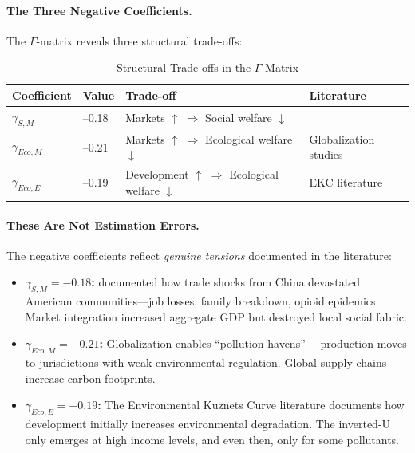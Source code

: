 \paragraph{The Three Negative Coefficients.}
The $\Gamma$-matrix reveals three structural trade-offs:

\begin{table}[htbp]
\centering
\caption{Structural Trade-offs in the $\Gamma$-Matrix}
\label{tab:structural-tradeoffs}
\renewcommand{\arraystretch}{1.4}
\begin{tabular}{@{}llll@{}}
\toprule
\textbf{Coefficient} & \textbf{Value} & \textbf{Trade-off} & \textbf{Literature} \\
\midrule
$\gamma_{S,M}$ & --0.18 & Markets $\uparrow$ $\Rightarrow$ Social welfare $\downarrow$ & \citet{autor2013china} \\
$\gamma_{Eco,M}$ & --0.21 & Markets $\uparrow$ $\Rightarrow$ Ecological welfare $\downarrow$ & Globalization studies \\
$\gamma_{Eco,E}$ & --0.19 & Development $\uparrow$ $\Rightarrow$ Ecological welfare $\downarrow$ & EKC literature \\
\bottomrule
\end{tabular}
\end{table}

\paragraph{These Are Not Estimation Errors.}
The negative coefficients reflect \emph{genuine tensions} documented in the literature:

\begin{itemize}
\item \textbf{$\gamma_{S,M} = -0.18$:} \citet{autor2013china} documented how trade 
shocks from China devastated American communities---job losses, family breakdown, 
opioid epidemics. Market integration increased aggregate GDP but destroyed 
local social fabric.

\item \textbf{$\gamma_{Eco,M} = -0.21$:} Globalization enables ``pollution havens''---
production moves to jurisdictions with weak environmental regulation. 
Global supply chains increase carbon footprints.

\item \textbf{$\gamma_{Eco,E} = -0.19$:} The Environmental Kuznets Curve literature 
documents how development initially increases environmental degradation. 
The inverted-U only emerges at high income levels, and even then, only for 
some pollutants.
\end{itemize}


